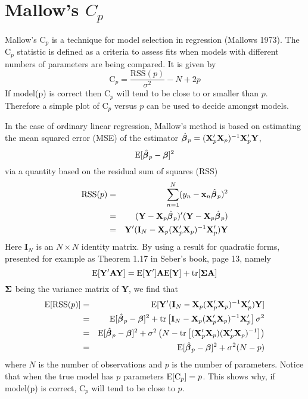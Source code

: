 \section{Mallow's $C_p$}
Mallow's  $\mbox{C}_p$  is a technique for model
selection in regression (Mallows 1973). The $\mbox{C}_p$ statistic is
defined  as a criteria 
to assess fits when models with different numbers of parameters are being
compared. It is given by
\begin{equation}
\label{Cpdef}
\mbox{C}_p = \frac{\mbox{RSS}(p)}{\sigma^2} - N + 2p
\end{equation}
If model(p) is correct then  $\mbox{C}_p$ will tend to be close to or
smaller than $p$. Therefore a simple plot of $\mbox{C}_p$ versus $p$ can be used
to decide amongst models.

In the case of ordinary linear regression, Mallow's method is based on 
estimating the mean squared error (MSE) of 
the estimator $\hat{\mbox{\boldmath $\beta$\unboldmath}\:}\!_p = {(\mathbf{X}_p'\mathbf{X}_p)^{-1}\mathbf{X}_p'\mathbf{Y}}$,
\[
\mbox{E} [\hat{\mbox{\boldmath $\beta$\unboldmath}\:}\!_p - \mbox{\boldmath $\beta$\unboldmath}]^2
\]
via a quantity based on the residual sum of squares (RSS)
\begin{eqnarray*}
\mbox{RSS}(p) &=& \sum_{n=1}^N (y_n
-\mathbf{x}_n\hat{\mbox{\boldmath $\beta$\unboldmath}\:}\!_p)^2\\ 
&=& (\mathbf{Y}-\mathbf{X}_p\hat{\mbox{\boldmath $\beta$\unboldmath}\:}\!_p)'(\mathbf{Y}-\mathbf{X}_p\hat{\mbox{\boldmath $\beta$\unboldmath}\:}\!_p)\\
&=& \mathbf{Y}' ( \mathbf{I}_N - \mathbf{X}_p(\mathbf{X}_p'\mathbf{X}_p)^{-1}\mathbf{X}_p') \mathbf{Y}
\end{eqnarray*}
Here $\mathbf{I}_N$ is an $N\times N$ identity matrix.
By using a result for quadratic forms, presented for example as
Theorem 1.17 in Seber's book, page 13, namely
\[
\mbox{E}[\mathbf{Y'AY}] = \mbox{E}\mathbf{[Y']A}\mbox{E}[\mathbf{Y}] + \mbox{tr}[\mbox{\boldmath $\Sigma$\unboldmath}
\mathbf{A}] 
\]
$\mbox{\boldmath $\Sigma$\unboldmath}$ being the variance matrix of $\mathbf{Y}$,
we find that  
\begin{eqnarray*}
\mbox{E} [\mbox{RSS}(p)] 
&=& \mbox{E}[\mathbf{Y}' ( \mathbf{I}_N - \mathbf{X}_p(\mathbf{X}_p'\mathbf{X}_p)^{-1}\mathbf{X}_p') \mathbf{Y}]\\
&=&\mbox{E} [\hat{\mbox{\boldmath $\beta$\unboldmath}\:}\!_p - \mbox{\boldmath $\beta$\unboldmath}]^2 + \mbox{tr}\left[\mathbf{I}_N - \mathbf{X}_p(\mathbf{X}_p'\mathbf{X}_p)^{-1}\mathbf{X}_p'\right]\sigma^2 \\
&=& \mbox{E}[ \hat{\mbox{\boldmath $\beta$\unboldmath}\:}\!_p - \mbox{\boldmath $\beta$\unboldmath}]^2 + \sigma^2\left(N - \mbox{tr}
\left[{(\mathbf{X}_p'\mathbf{X}_p)(\mathbf{X}_p'\mathbf{X}_p)^{-1}}\right]\right)\\
&=& \mbox{E} [\hat{\mbox{\boldmath $\beta$\unboldmath}\:}\!_p - \mbox{\boldmath $\beta$\unboldmath}]^2 + \sigma^2(N - p)
\end{eqnarray*}
where $N$ is the number of observations and $p$ is the number of
parameters. Notice that when the true model has $p$ parameters
$\mbox{E}[\mbox{C}_p] = p$.  
This shows why, if model(p) is correct, $\mbox{C}_p$ will
tend to be close to $p$. 


